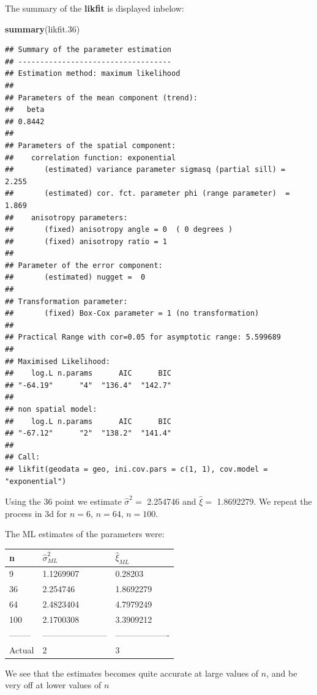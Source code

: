 \documentclass[]{article}
\newenvironment{Shaded}{\begin{snugshade}}{\end{snugshade}}
\newcommand{\KeywordTok}[1]{\textcolor[rgb]{0.13,0.29,0.53}{\textbf{#1}}}
\newcommand{\DecValTok}[1]{\textcolor[rgb]{0.00,0.00,0.81}{#1}}
\newcommand{\NormalTok}[1]{#1}
\begin{document}
The summary of the \textbf{likfit} is displayed inbelow:

\begin{Shaded}
\begin{Highlighting}[]
\KeywordTok{summary}\NormalTok{(likfit.}\DecValTok{36}\NormalTok{)}
\end{Highlighting}
\end{Shaded}

\begin{verbatim}
## Summary of the parameter estimation
## -----------------------------------
## Estimation method: maximum likelihood 
## 
## Parameters of the mean component (trend):
##   beta 
## 0.8442 
## 
## Parameters of the spatial component:
##    correlation function: exponential
##       (estimated) variance parameter sigmasq (partial sill) =  2.255
##       (estimated) cor. fct. parameter phi (range parameter)  =  1.869
##    anisotropy parameters:
##       (fixed) anisotropy angle = 0  ( 0 degrees )
##       (fixed) anisotropy ratio = 1
## 
## Parameter of the error component:
##       (estimated) nugget =  0
## 
## Transformation parameter:
##       (fixed) Box-Cox parameter = 1 (no transformation)
## 
## Practical Range with cor=0.05 for asymptotic range: 5.599689
## 
## Maximised Likelihood:
##    log.L n.params      AIC      BIC 
## "-64.19"      "4"  "136.4"  "142.7" 
## 
## non spatial model:
##    log.L n.params      AIC      BIC 
## "-67.12"      "2"  "138.2"  "141.4" 
## 
## Call:
## likfit(geodata = geo, ini.cov.pars = c(1, 1), cov.model = "exponential")
\end{verbatim}

Using the 36 point we estimate \(\hat\sigma^2 =\) 2.254746 and
\(\hat \xi =\) 1.8692279. We repeat the process in 3d for \(n=6\),
\(n=64\), \(n=100\).

\newpage

The ML estimates of the parameters were:

\begin{longtable}[]{@{}lll@{}}
\toprule
n & \(\hat \sigma^2_{ML}\) & \(\hat\xi_{ML}\)\tabularnewline
\midrule
\endhead
9 & 1.1269907 & 0.28203\tabularnewline
36 & 2.254746 & 1.8692279\tabularnewline
64 & 2.4823404 & 4.7979249\tabularnewline
100 & 2.1700308 & 3.3909212\tabularnewline
-------- & ----------------------- & -------------------\tabularnewline
Actual & 2 & 3\tabularnewline
\bottomrule
\end{longtable}

We see that the estimates becomes quite accurate at large values of
\(n\), and be very off at lower values of \(n\)
\end{document}
